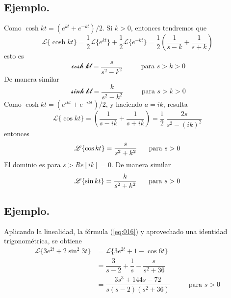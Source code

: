 \subsection*{Ejemplo.}
Como $\cosh kt = (e^{kt} + e^{-kt}) / 2$. Si $k > 0$, entonces tendremos que
\[ \mathscr{L} \{ \cosh kt \} = \dfrac{1}{2} \mathscr{L} \{ e^{kt} \} + \dfrac{1}{2} \mathscr{L} \{ e^{-kt} \} = \dfrac{1}{2} \left( \dfrac{1}{s - k} + \dfrac{1}{s + k} \right) \]
esto es
\begin{equation}
\mathscr{ \cosh kt} = \dfrac{s}{s^{2} - k^{2}} \hspace{1cm} \mbox{ para } s > k > 0
\label{eq:014}
\end{equation}
De manera similar
\begin{equation}
\mathscr{ \sinh kt} = \dfrac{k}{s^{2} - k^{2}} \hspace{1cm} \mbox{ para } s > k > 0
\label{eq:015}
\end{equation}
Como $\cosh kt = (e^{ikt} + e^{-ikt})/2$, y haciendo $a = ik$, resulta
\[ \mathscr{L} \{ \cos kt \} = \left( \dfrac{1}{s - ik} + \dfrac{1}{s + ik} \right) =  \dfrac{1}{2} \; \dfrac{2s}{s^{2} - (ik)^{2}} \]
entonces
\begin{equation}
\mathscr{L} \{ \cos kt \} = \dfrac{s}{s^{2} + k^{2}} \hspace{0.5cm} \mbox{ para } s > 0
\label{eq:016}
\end{equation}
El dominio es para $s > Re[ik] = 0$. De manera similar
\begin{equation}
\mathscr{L} \{ \sin kt \} = \dfrac{k}{s^{2} + k^{2}} \hspace{0.5cm} \mbox{ para } s > 0
\label{eq:017}
\end{equation}
\subsection*{Ejemplo.}
Aplicando la linealidad, la fórmula (\ref{eq:016}) y aprovechado una identidad trigonométrica, se obtiene
\[ \begin{split}
\mathscr{L} \{ 3 e^{2t} + 2 \sin^{2} 3t \} &= \mathscr{L} \{ 3 e^{2t} + 1 - \cos 6t \} \\
&= \dfrac{3}{s - 2} + \dfrac{1}{s} - \dfrac{s}{s^{2} + 36} \\
&= \dfrac{3 s^{3} + 144s - 72}{s(s - 2)(s^{2} +  36)} \hspace{1cm} \mbox{ para } s > 0
\end{split} \]
